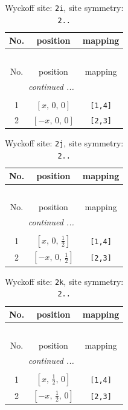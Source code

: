 \documentclass[fleqn,8pt]{jsarticle}
\begin{document}
\renewcommand{\arraystretch}{1.2}
\begin{longtable}{ccc}
\caption{Wyckoff site: {\tt 2i}, site symmetry: {\tt 2..}}
 \\
 \hline \hline
No. & position & mapping \\ \hline \endfirsthead

\multicolumn{2}{l}{\tablename\ \thetable{}} \\
 \hline \hline
No. & position & mapping \\ \hline \endhead

 \hline \hline
\multicolumn{2}{r}{\footnotesize\it continued ...} \\ \endfoot

 \hline \hline
\multicolumn{2}{r}{} \\ \endlastfoot

1 & $\left[ x,\, 0,\, 0 \right]$ & {\tt [1,4]} \\ \hline
2 & $\left[ - x,\, 0,\, 0 \right]$ & {\tt [2,3]} \\
\end{longtable}
\renewcommand{\arraystretch}{1.2}
\begin{longtable}{ccc}
\caption{Wyckoff site: {\tt 2j}, site symmetry: {\tt 2..}}
 \\
 \hline \hline
No. & position & mapping \\ \hline \endfirsthead

\multicolumn{2}{l}{\tablename\ \thetable{}} \\
 \hline \hline
No. & position & mapping \\ \hline \endhead

 \hline \hline
\multicolumn{2}{r}{\footnotesize\it continued ...} \\ \endfoot

 \hline \hline
\multicolumn{2}{r}{} \\ \endlastfoot

1 & $\left[ x,\, 0,\, \frac{1}{2} \right]$ & {\tt [1,4]} \\ \hline
2 & $\left[ - x,\, 0,\, \frac{1}{2} \right]$ & {\tt [2,3]} \\
\end{longtable}
\renewcommand{\arraystretch}{1.2}
\begin{longtable}{ccc}
\caption{Wyckoff site: {\tt 2k}, site symmetry: {\tt 2..}}
 \\
 \hline \hline
No. & position & mapping \\ \hline \endfirsthead

\multicolumn{2}{l}{\tablename\ \thetable{}} \\
 \hline \hline
No. & position & mapping \\ \hline \endhead

 \hline \hline
\multicolumn{2}{r}{\footnotesize\it continued ...} \\ \endfoot

 \hline \hline
\multicolumn{2}{r}{} \\ \endlastfoot

1 & $\left[ x,\, \frac{1}{2},\, 0 \right]$ & {\tt [1,4]} \\ \hline
2 & $\left[ - x,\, \frac{1}{2},\, 0 \right]$ & {\tt [2,3]} \\
\end{longtable}
\end{document}
